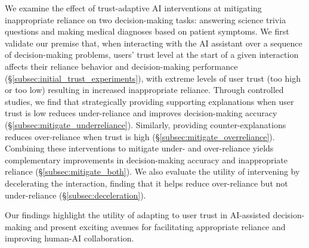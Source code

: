 We examine the effect of trust-adaptive AI interventions at mitigating inappropriate reliance on two decision-making tasks: answering science trivia questions and making medical diagnoses based on patient symptoms. 
We first validate our premise that, when interacting with the AI assistant over a sequence of decision-making problems, users' trust level at the start of a given interaction affects their reliance behavior and decision-making performance (\S\ref{subsec:initial_trust_experiments}), with extreme levels of user trust (too high or too low) resulting in increased inappropriate reliance. 
Through controlled studies, we find that strategically providing supporting explanations when user trust is low reduces under-reliance and improves decision-making accuracy (\S\ref{subsec:mitigate_underreliance}). 
Similarly, providing counter-explanations reduces over-reliance when trust is high (\S\ref{subsec:mitigate_overreliance}). 
Combining these interventions to mitigate under- and over-reliance yields complementary improvements in decision-making accuracy and inappropriate reliance (\S\ref{subsec:mitigate_both}). 
We also evaluate the utility of intervening by decelerating the interaction, finding that it helps reduce over-reliance but not under-reliance (\S\ref{subsec:deceleration}). 

Our findings highlight the utility of adapting to user trust in AI-assisted decision-making and present exciting avenues for facilitating appropriate reliance and improving human-AI collaboration.